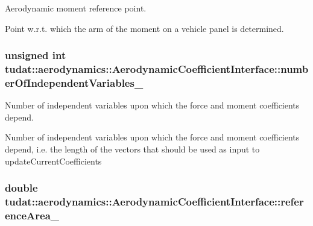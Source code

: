Aerodynamic moment reference point. 

Point w.\+r.\+t. which the arm of the moment on a vehicle panel is determined. 
\subsubsection[{\texorpdfstring{number\+Of\+Independent\+Variables\+\_\+}{numberOfIndependentVariables_}}]{\setlength{\rightskip}{0pt plus 5cm}unsigned int tudat\+::aerodynamics\+::\+Aerodynamic\+Coefficient\+Interface\+::number\+Of\+Independent\+Variables\+\_\+\hspace{0.3cm}{\ttfamily [protected]}}\hypertarget{classtudat_1_1aerodynamics_1_1AerodynamicCoefficientInterface_ab8d9151ab40af2f5bce2cf0208020e1b}{}\label{classtudat_1_1aerodynamics_1_1AerodynamicCoefficientInterface_ab8d9151ab40af2f5bce2cf0208020e1b}


Number of independent variables upon which the force and moment coefficients depend. 

Number of independent variables upon which the force and moment coefficients depend, i.\+e. the length of the vectors that should be used as input to update\+Current\+Coefficients 
\subsubsection[{\texorpdfstring{reference\+Area\+\_\+}{referenceArea_}}]{\setlength{\rightskip}{0pt plus 5cm}double tudat\+::aerodynamics\+::\+Aerodynamic\+Coefficient\+Interface\+::reference\+Area\+\_\+\hspace{0.3cm}{\ttfamily [protected]}}\hypertarget{classtudat_1_1aerodynamics_1_1AerodynamicCoefficientInterface_af4588066ab70f6866f5754016c7876c3}{}\label{classtudat_1_1aerodynamics_1_1AerodynamicCoefficientInterface_af4588066ab70f6866f5754016c7876c3}



